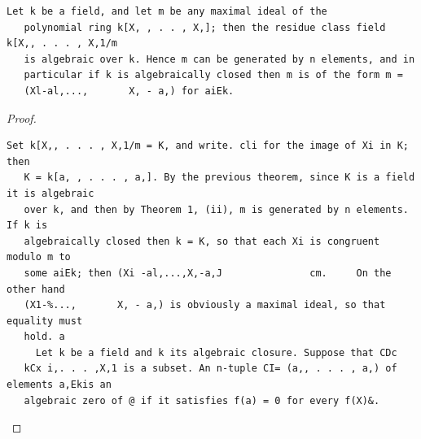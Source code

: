 \begin{theorem}\label{mcrt-auto-theorem-5-3}\uses{}
\begin{verbatim}
Let k be a field, and let m be any maximal ideal of the
   polynomial ring k[X, , . . , X,]; then the residue class field k[X,, . . . , X,1/m
   is algebraic over k. Hence m can be generated by n elements, and in
   particular if k is algebraically closed then m is of the form m =
   (Xl-al,...,       X, - a,) for aiEk.
\end{verbatim}
\end{theorem}
\begin{proof}
\begin{verbatim}
Set k[X,, . . . , X,1/m = K, and write. cli for the image of Xi in K; then
   K = k[a, , . . . , a,]. By the previous theorem, since K is a field it is algebraic
   over k, and then by Theorem 1, (ii), m is generated by n elements. If k is
   algebraically closed then k = K, so that each Xi is congruent modulo m to
   some aiEk; then (Xi -al,...,X,-a,J               cm.     On the other hand
   (X1-%...,       X, - a,) is obviously a maximal ideal, so that equality must
   hold. a
     Let k be a field and k its algebraic closure. Suppose that CDc
   kCx i,. . . ,X,1 is a subset. An n-tuple CI= (a,, . . . , a,) of elements a,Ekis an
   algebraic zero of @ if it satisfies f(a) = 0 for every f(X)&.
\end{verbatim}
\end{proof}


